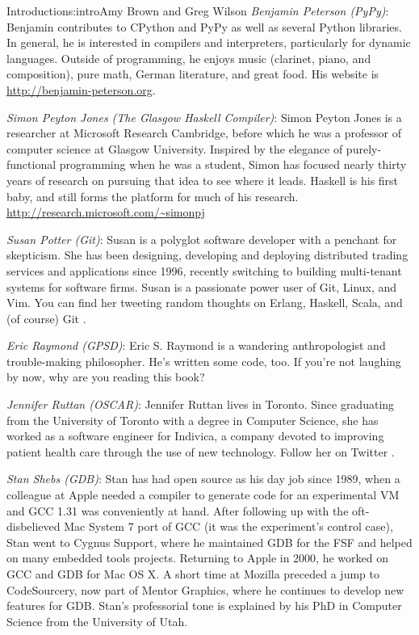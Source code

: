 \begin{aosachapter}{Introduction}{s:intro}{Amy Brown and Greg Wilson}
\emph{Benjamin Peterson (PyPy)}: Benjamin contributes to CPython and PyPy as
well as several Python libraries. In general, he is interested in compilers and
interpreters, particularly for dynamic languages. Outside of programming, he
enjoys music (clarinet, piano, and composition), pure math, German literature,
and great food. His website is \url{http://benjamin-peterson.org}.

\emph{Simon Peyton Jones (The Glasgow Haskell Compiler)}: Simon Peyton Jones is
a researcher at Microsoft Research Cambridge, before which he was a professor
of computer science at Glasgow University.  Inspired by the elegance of
purely-functional programming when he was a student, Simon has focused nearly
thirty years of research on pursuing that idea to see where it leads.  Haskell
is his first baby, and still forms the platform for much of his research.
\url{http://research.microsoft.com/~simonpj}

\emph{Susan Potter (Git)}: Susan is a polyglot software developer with a
penchant for skepticism. She has been designing, developing and deploying
distributed trading services and applications since 1996, recently switching
to building multi-tenant systems for software firms. Susan is a passionate
power user of Git, Linux, and Vim. You can find her tweeting random thoughts
on Erlang, Haskell, Scala, and (of course) Git .

\emph{Eric Raymond (GPSD)}: Eric S. Raymond is a wandering anthropologist and
trouble-making philosopher.  He's written some code, too. If you're not laughing
by now, why are you reading this book?

\emph{Jennifer Ruttan (OSCAR)}: Jennifer Ruttan lives in Toronto. Since
graduating from the University of Toronto with a degree in Computer Science,
she has worked as a software engineer for Indivica, a company devoted to
improving patient health care through the use of new technology. Follow her on
Twitter .

\emph{Stan Shebs (GDB)}: Stan has had open source as his day job since
1989, when a colleague at Apple needed a compiler to generate code for
an experimental VM and GCC 1.31 was conveniently at hand.  After
following up with the oft-disbelieved Mac System 7 port of GCC (it was
the experiment's control case), Stan went to Cygnus Support, where he
maintained GDB for the FSF and helped on many embedded tools projects.
Returning to Apple in 2000, he worked on GCC and GDB for Mac OS X.  A
short time at Mozilla preceded a jump to CodeSourcery, now part of
Mentor Graphics, where he continues to develop new features for GDB.
Stan's professorial tone is explained by his PhD in Computer Science
from the University of Utah.


\end{aosachapter}
